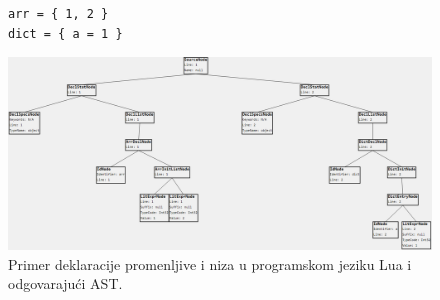 \begin{figure}[h!]
\begin{lstlisting}
arr = { 1, 2 }
dict = { a = 1 }
\end{lstlisting}
\centering
\includegraphics[scale=0.4]{images/lua_ast_decl.png}
\caption{Primer deklaracije promenljive i niza u programskom jeziku Lua i odgovarajući AST.}
\label{fig:MyASTExampleLuaDeclaration}
\end{figure}

